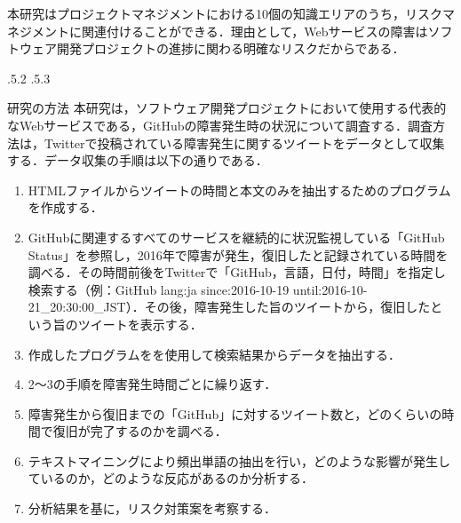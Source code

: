 \documentclass[uplatex]{jsarticle}
\makeatletter
\renewcommand{\section}{%
    \if@slide\clearpage\fi
    \@startsection{section}{1}{\z@}%
    {\Cvs \@plus.5\Cdp \@minus.2\Cdp}%
    {.5\Cvs \@plus.3\Cdp}%
    {\normalfont\raggedright}}
\makeatother
\begin{document}
本研究はプロジェクトマネジメントにおける10個の知識エリアのうち，リスクマネジメントに関連付けることができる．理由として，Webサービスの障害はソフトウェア開発プロジェクトの進捗に関わる明確なリスクだからである．

\section{研究の方法}
本研究は，ソフトウェア開発プロジェクトにおいて使用する代表的なWebサービスである，GitHubの障害発生時の状況について調査する．調査方法は，Twitterで投稿されている障害発生に関するツイートをデータとして収集する．データ収集の手順は以下の通りである\cite{03}．
\begin{enumerate}
 \item HTMLファイルからツイートの時間と本文のみを抽出するためのプログラムを作成する\cite{04}．
 \item GitHubに関連するすべてのサービスを継続的に状況監視している「GitHub Status」を参照し，2016年で障害が発生，復旧したと記録されている時間を調べる．その時間前後をTwitterで「GitHub，言語，日付，時間」を指定し検索する（例：GitHub lang:ja since:2016-10-19 until:2016-10-21\_20:30:00\_JST）．その後，障害発生した旨のツイートから，復旧したという旨のツイートを表示する．
 \item 作成したプログラムをを使用して検索結果からデータを抽出する．
 \item 2～3の手順を障害発生時間ごとに繰り返す．
 \item 障害発生から復旧までの「GitHub」に対するツイート数と，どのくらいの時間で復旧が完了するのかを調べる．
 \item テキストマイニングにより頻出単語の抽出を行い，どのような影響が発生しているのか，どのような反応があるのか分析する．
 \item 分析結果を基に，リスク対策案を考察する．
\end{enumerate}
\end{document}
